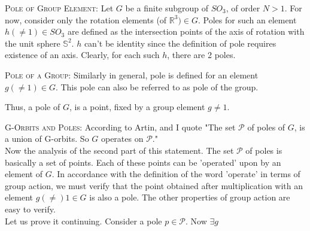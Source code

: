 \documentclass[12pt]{article}
\begin{document}
\textsc {Pole of Group Element: } Let $G$ be a finite subgroup of $SO_{3}$, of order $N > 1$. For now, consider only the rotation elements (of $\mathbb{R}^3) \in G$. Poles for such an element $h(\neq 1) \in SO_{3}$ are defined as the intersection points of the axis of rotation with the unit sphere $\mathbb{S}^2$. $h$ can't be identity since the definition of pole requires existence of an axis. Clearly, for each such $h$, there are 2 poles.
\par
\textsc {Pole of a Group: } Similarly in general, pole is defined for an element $g(\neq 1) \in G$. This pole can also be referred to as pole of the group.
\par
Thus, a pole of $G$, is a point, fixed by a group element $g \neq 1$.
\par
\textsc {G-Orbits and Poles: } According to Artin, and I quote "The set $\mathcal P$ of poles of $G$, is a union of G-orbits. So $G$ operates on $\mathcal P$."\\
Now the analysis of the second part of this statement. The set $\mathcal P$ of poles is basically a set of points. Each of these points can be 'operated' upon by an element of $G$. In accordance with the definition of the word 'operate' in terms of group action, we must verify that the point obtained after multiplication with an element $g(\neq) 1 \in G$ is also a pole. The other properties of group action are easy to verify.\\
Let us prove it continuing. Consider a pole $p \in \mathcal P$. Now $\exists g $ 



\vspace{12pt}

\end{document}
